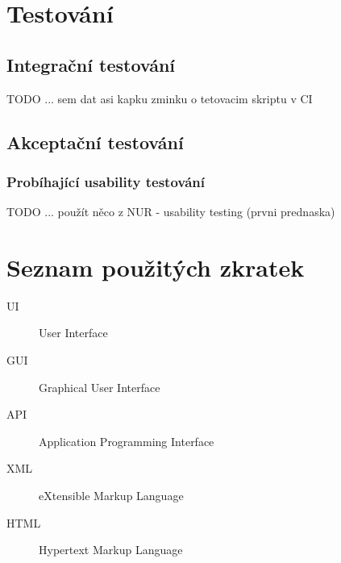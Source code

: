 \documentclass[thesis=M,czech]{FITthesis}[2012/06/26]
\begin{document}
\chapter{Testování} \label{chap:testovani}
\section{Integrační testování} \label{sec:testovani_integracni}	
TODO ... sem dat asi kapku zminku o tetovacim skriptu v CI
\section{Akceptační testování} \label{sec:testovani_akceptacni}
\subsection{Probíhající usability testování} \label{subsec:testovani_akceptacni_utest} %
TODO ... použít něco z NUR - usability testing (prvni prednaska)

\begin{conclusion}
\end{conclusion}

\nocite{*}



\appendix

\chapter{Seznam použitých zkratek}
\begin{description}
	\item[UI] User Interface
	\item[GUI] Graphical User Interface
	\item[API] Application Programming Interface
	\item[XML] eXtensible Markup Language
	\item[HTML] Hypertext Markup Language
\end{description}
\end{document}
